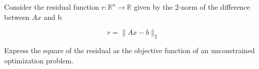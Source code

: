 Consider the residual function $r: \mathbb{R}^n \to \mathbb{R}$ given by the 2-norm of the difference between $Ax$ and 
$b$:

$$
r = \lVert Ax - b \rVert_2
$$

Express the square of the residual as the objective function of an unconstrained optimization problem.

\begin{solution}
  \ \\
  \vfill
\end{solution}